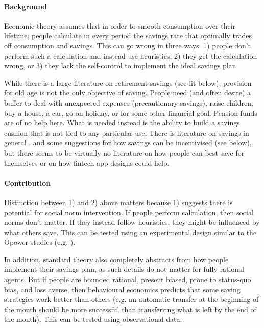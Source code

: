 \documentclass[a4paper, 11pt]{report}
\begin{document}
\paragraph{Background}
Economic theory assumes that in order to smooth consumption over their lifetime, people calculate in every period the savings rate that optimally trades off consumption and savings. This can go wrong in three ways: 1) people don't perform such a calculation and instead use heuristics, 2) they get the calculation wrong, or 3) they lack the self-control to implement the ideal savings plan

While there is a large literature on  retirement savings (see lit below), provision for old age is not the only objective of saving. People need (and often desire) a buffer to deal with unexpected expenses (precautionary savings), raise children, buy a house, a car, go on holiday, or for some other financial goal. Pension funds are of no help here. What is needed instead is the ability to build a savings cushion that is not tied to any particular use. There is literature on savings in general \citep{browning1996household,lusardi2000explaining}, and some suggestions for how savings can be incentivised \citep{thaler1994psychology} (see below), but there seems to be virtually no literature on how people can best save for themselves or on how fintech app designs could help.

\paragraph{Contribution}

Distinction between 1) and 2) above matters because 1) suggests there is potential for social norm intervention. If people perform calculation, then social norms don't matter. If they instead follow heuristics, they might be influenced by what others save. This can be tested using an experimental design similar to the Opower studies (e.g. \citet{schultz2007constructive, allcott2011social, allcott2014short}).

In addition, standard theory also completely abstracts from how people implement their savings plan, as such details do not matter for fully rational agents. But if people are bounded rational, present biased, prone to status-quo bias, and loss averse, then behavioural economics predicts that some saving strategies work better than others (e.g. an automatic transfer at the beginning of the month should be more successful than transferring what is left by the end of the month). This can be tested using observational data.
\end{document}
